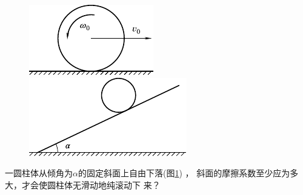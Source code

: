 \begin{exercises}
\begin{figure}[h]
  \begin{minipage}{0.4\linewidth}
    \centering
    \includegraphics{figure/fig10.33}
    \caption{}
    \label{fig:10.33}
  \end{minipage}
  \begin{minipage}{0.6\linewidth}
    \centering
    \includegraphics{figure/fig10.34}
    \caption{}
    \label{fig:10.34}
  \end{minipage}
\end{figure}

\exercise 一圆柱体从倾角为$ \alpha $的固定斜面上自由下落(图\ref{fig:10.34}) ，
斜面的摩擦系数至少应为多大，才会使圆柱体无滑动地纯滚动下
来？

\end{exercises}
